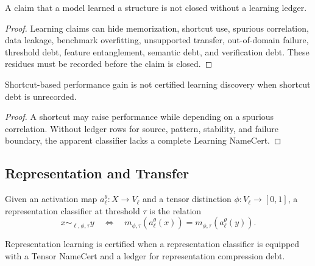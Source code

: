 \begin{theorem}
\label{thm:philosophy-learning-claims-require-ledger}
A claim that a model learned a structure is not closed without a
learning ledger.
\end{theorem}
\begin{proof}
Learning claims can hide memorization, shortcut use, spurious
correlation, data leakage, benchmark overfitting, unsupported transfer,
out-of-domain failure, threshold debt, feature entanglement, semantic
debt, and verification debt. These residues must be recorded before the
claim is closed.
\end{proof}

\begin{theorem}
\label{thm:philosophy-shortcut-learning-not-certified-without-ledger}
Shortcut-based performance gain is not certified learning discovery when
shortcut debt is unrecorded.
\end{theorem}
\begin{proof}
A shortcut may raise performance while depending on a spurious
correlation. Without ledger rows for source, pattern, stability, and
failure boundary, the apparent classifier lacks a complete Learning
NameCert.
\end{proof}

\subsection{Representation and Transfer}
\label{subsec:philosophy-learning-representation-transfer}

\begin{definition}
\label{def:philosophy-representation-classifier}
Given an activation map $a_{\ell}^{\theta}:X\to V_{\ell}$ and a tensor
distinction $\phi:V_{\ell}\to[0,1]$, a representation classifier at
threshold $\tau$ is the relation
$$
x\sim_{\ell,\phi,\tau}y
\quad\Longleftrightarrow\quad
m_{\phi,\tau}(a_{\ell}^{\theta}(x))
=
m_{\phi,\tau}(a_{\ell}^{\theta}(y)).
$$
\end{definition}

\begin{definition}
\label{def:philosophy-certified-representation-learning}
Representation learning is certified when a representation classifier is
equipped with a Tensor NameCert and a ledger for representation
compression debt.
\end{definition}

